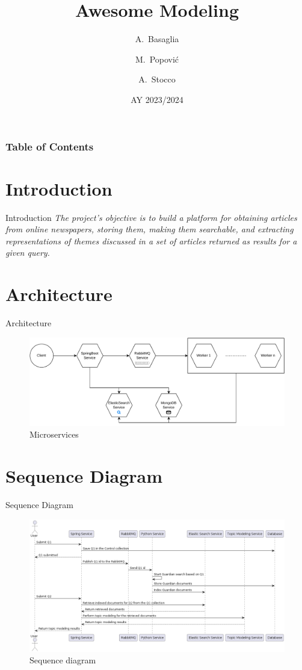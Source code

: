 \documentclass{beamer}
\title{Awesome Modeling}
\institute{University of Padua}
\date{AY 2023/2024}
\author[Basaglia, Popović, Stocco]
{A.~Basaglia\inst{1} \and M.~Popović\inst{1} \and A.~Stocco\inst{1}}
\institute[UniPD]
{
  \inst{1}
  University of Padua
}
\begin{document}
\frame{\titlepage}

\begin{frame}
\frametitle{Table of Contents}
\tableofcontents
\end{frame}

\section{Introduction}
\begin{frame}{Introduction}
\textit{The project’s objective is to build a platform for obtaining articles
from online newspapers, storing them, making them searchable, and
extracting representations of themes discussed in a set of articles
returned as results for a given query.}
\end{frame}

\section{Architecture}
\begin{frame}{Architecture}
\begin{figure}[ht]
    \centering
    \includegraphics[width=1\linewidth] {microservices.drawio.pdf}
    \caption{Microservices}
    \label{fig:microservices}
\end{figure}
\end{frame}

\section{Sequence Diagram}
\begin{frame}{Sequence Diagram}
\begin{figure}[ht]
    \centering
    \includegraphics[width=0.7\linewidth]{figures/sequenceDiagram.png}
    \caption{Sequence diagram}
    \label{fig:seqDiagram}
\end{figure}
\end{frame}
\end{document}
